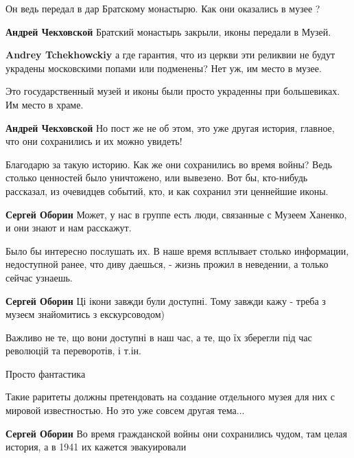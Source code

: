 \begin{itemize}
Он ведь передал в дар Братскому монастырю. Как они оказались в музее ?

\begin{itemize} %
\textbf{Андрей Чекховской} Братский монастырь закрыли, иконы передали в Музей.

\textbf{Andrey Tchekhowckiy} а где гарантия, что из церкви эти реликвии не будут украдены московскими попами или подменены? Нет уж, им место в музее.
\end{itemize} %

Это государственный музей и иконы были просто украденны при большевиках. Им место в храме.

\textbf{Андрей Чекховской} Но пост же не об этом, это уже другая история, главное, что они сохранились и их можно увидеть!


Благодарю за такую историю. Как же они сохранились во время войны? Ведь столько
ценностей было уничтожено, или вывезено. Вот бы, кто-нибудь рассказал, из
очевидцев событий, кто, и как сохранил эти ценнейшие иконы.

\begin{itemize} %
\textbf{Сергей Оборин} Может, у нас в группе есть люди, связанные с Музеем Ханенко, и они знают и нам расскажут.


Было бы интересно послушать их. В наше время всплывает столько информации,
недоступной ранее, что диву даешься, - жизнь прожил в неведении, а только
сейчас узнаешь.

\textbf{Сергей Оборин} Ці ікони завжди були доступні. Тому завжди кажу - треба з музеєм знайомитись з екскурсоводом)

Важливо не те, що вони доступні в наш час, а те, що їх зберегли під час революцій та переворотів, і т.ін.

Просто фантастика

Такие раритеты должны
претендовать на создание отдельного музея для них с мировой известностью. Но это уже совсем другая тема...

\textbf{Сергей Оборин} Во время гражданской войны они сохранились чудом, там целая история, а в 1941 их кажется эвакуировали
\end{itemize} %


\end{itemize}
